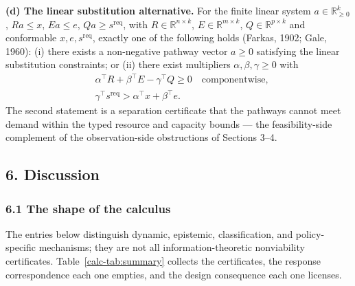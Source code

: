 \documentclass[10pt,twocolumn]{article}
\theoremstyle{definition}
\begin{document}
\textbf{(d) The linear substitution alternative.} For the finite linear system \(a\in\mathbb R^k_{\ge0}\), \(Ra\le x\), \(Ea\le e\), \(Qa\ge s^{\mathrm{req}}\), with \(R\in\mathbb R^{n\times k}\), \(E\in\mathbb R^{m\times k}\), \(Q\in\mathbb R^{p\times k}\) and conformable \(x,e,s^{\mathrm{req}}\), exactly one of the following holds (Farkas, 1902; Gale, 1960): (i) there exists a non-negative pathway vector \(a \ge 0\) satisfying the linear substitution constraints; or (ii) there exist multipliers \(\alpha, \beta, \gamma \ge 0\) with
\[
\begin{aligned}
&\alpha^\top R + \beta^\top E - \gamma^\top Q \ge 0 \quad\text{componentwise},\\
&\gamma^\top s^{\mathrm{req}} > \alpha^\top x + \beta^\top e.
\end{aligned}
\]
The second statement is a separation certificate that the pathways cannot meet demand within the typed resource and capacity bounds --- the feasibility-side complement of the observation-side obstructions of Sections 3--4.
\subsection{6. Discussion}\label{calc-discussion}


\subsubsection{6.1 The shape of the
calculus}\label{calc-the-shape-of-the-calculus}

The entries below distinguish dynamic, epistemic, classification, and policy-specific mechanisms; they are not all information-theoretic nonviability certificates. Table~\ref{calc-tab:summary} collects the certificates, the response correspondence each one empties, and the design consequence each one licenses.
\end{document}

